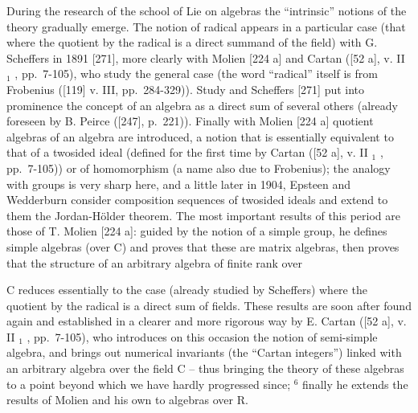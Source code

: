 During the research of the school of Lie on algebras the ``intrinsic'' notions of the theory gradually emerge. The notion of radical appears in a particular case (that where the quotient by the radical is a direct summand of the field) with G. Scheffers in 1891 {[}271{]}, more clearly with Molien {[}224 a{]} and Cartan ({[}52 a{]}, v. II \(_{1}\) , pp.~7-105), who study the general case (the word ``radical'' itself is from Frobenius ({[}119{]} v. III, pp.~284-329)). Study and Scheffers {[}271{]} put into prominence the concept of an algebra as a direct sum of several others (already foreseen by B. Peirce ({[}247{]}, p.~221)). Finally with Molien {[}224 a{]} quotient algebras of an algebra are introduced, a notion that is essentially equivalent to that of a twosided ideal (defined for the first time by Cartan ({[}52 a{]}, v. II \(_{1}\) , pp.~7-105)) or of homomorphism (a name also due to Frobenius); the analogy with groups is very sharp here, and a little later in 1904, Epsteen and Wedderburn consider composition sequences of twosided ideals and extend to them the Jordan-Hölder theorem. The most important results of this period are those of T. Molien {[}224 a{]}: guided by the notion of a simple group, he defines simple algebras (over C) and proves that these are matrix algebras, then proves that the structure of an arbitrary algebra of finite rank over

C reduces essentially to the case (already studied by Scheffers) where the quotient by the radical is a direct sum of fields. These results are soon after found again and established in a clearer and more rigorous way by E. Cartan ({[}52 a{]}, v. II \(_{1}\) , pp.~7-105), who introduces on this occasion the notion of semi-simple algebra, and brings out numerical invariants (the ``Cartan integers'') linked with an arbitrary algebra over the field C -- thus bringing the theory of these algebras to a point beyond which we have hardly progressed since; \(^{6}\) finally he extends the results of Molien and his own to algebras over R.

